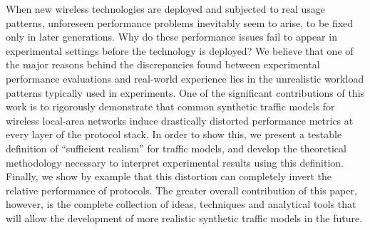 When new wireless technologies are deployed and subjected to real usage patterns, unforeseen performance problems inevitably seem to arise, to be fixed only in later generations. Why do these performance issues fail to appear in experimental settings before the technology is deployed? We believe that one of the major reasons behind the discrepancies found between experimental performance evaluations and real-world experience lies in the unrealistic workload patterns typically used in experiments. One of the significant contributions of this work is to rigorously demonstrate that common synthetic traffic models for wireless local-area networks induce drastically distorted performance metrics at every layer of the protocol stack. In order to show this, we present a testable definition of ``sufficient realism'' for traffic models, and develop the theoretical methodology necessary to interpret experimental results using this definition. Finally, we show by example that this distortion can completely invert the relative performance of protocols. The greater overall contribution of this paper, however, is the complete collection of ideas, techniques and analytical tools that will allow the development of more realistic synthetic traffic models in the future.
%
%

